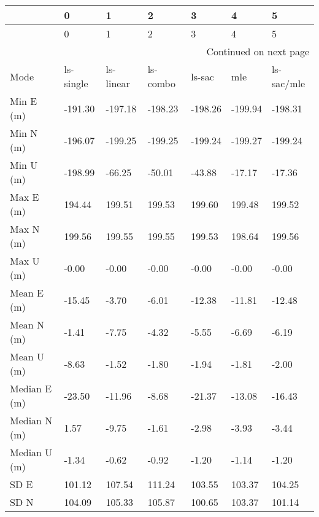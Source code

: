 \begin{longtable}{lllllll}
\toprule
{} &          0 &          1 &         2 &        3 &        4 &           5 \\
\midrule
\endfirsthead

\toprule
{} &          0 &          1 &         2 &        3 &        4 &           5 \\
\midrule
\endhead
\midrule
\multicolumn{7}{r}{{Continued on next page}} \\
\midrule
\endfoot

\bottomrule
\endlastfoot
Mode              &  ls-single &  ls-linear &  ls-combo &   ls-sac &      mle &  ls-sac/mle \\
Min E (m)         &    -191.30 &    -197.18 &   -198.23 &  -198.26 &  -199.94 &     -198.31 \\
Min N (m)         &    -196.07 &    -199.25 &   -199.25 &  -199.24 &  -199.27 &     -199.24 \\
Min U (m)         &    -198.99 &     -66.25 &    -50.01 &   -43.88 &   -17.17 &      -17.36 \\
Max E (m)         &     194.44 &     199.51 &    199.53 &   199.60 &   199.48 &      199.52 \\
Max N (m)         &     199.56 &     199.55 &    199.55 &   199.53 &   198.64 &      199.56 \\
Max U (m)         &      -0.00 &      -0.00 &     -0.00 &    -0.00 &    -0.00 &       -0.00 \\
Mean E (m)        &     -15.45 &      -3.70 &     -6.01 &   -12.38 &   -11.81 &      -12.48 \\
Mean N (m)        &      -1.41 &      -7.75 &     -4.32 &    -5.55 &    -6.69 &       -6.19 \\
Mean U (m)        &      -8.63 &      -1.52 &     -1.80 &    -1.94 &    -1.81 &       -2.00 \\
Median E (m)      &     -23.50 &     -11.96 &     -8.68 &   -21.37 &   -13.08 &      -16.43 \\
Median N (m)      &       1.57 &      -9.75 &     -1.61 &    -2.98 &    -3.93 &       -3.44 \\
Median U (m)      &      -1.34 &      -0.62 &     -0.92 &    -1.20 &    -1.14 &       -1.20 \\
SD E              &     101.12 &     107.54 &    111.24 &   103.55 &   103.37 &      104.25 \\
SD N              &     104.09 &     105.33 &    105.87 &   100.65 &   103.37 &      101.14 \\

\end{longtable}

